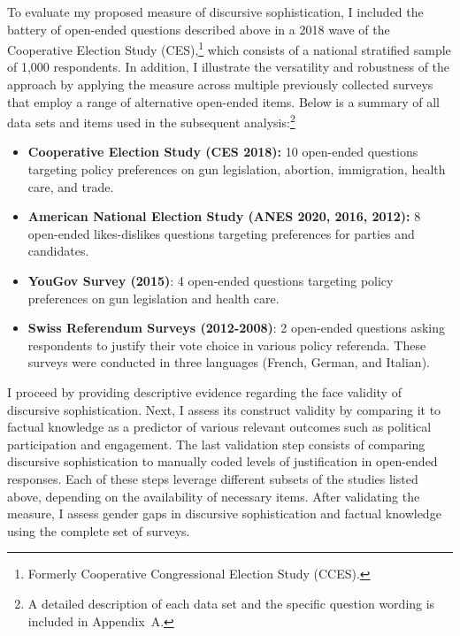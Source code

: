To evaluate my proposed measure of discursive sophistication, I included the battery of open-ended questions described above in a 2018 wave of the Cooperative Election Study (CES),\footnote{Formerly Cooperative Congressional Election Study (CCES).} which consists of a national stratified sample of 1,000 respondents. In addition, I illustrate the versatility and robustness of the approach by applying the measure across multiple previously collected surveys that employ a range of alternative open-ended items. Below is a summary of all data sets and items used in the subsequent analysis:\footnote{A detailed description of each data set and the specific question wording is included in Appendix~A.}

\begin{itemize}\singlespacing
	\item \textbf{Cooperative Election Study (CES 2018):} 10 open-ended questions targeting policy preferences on gun legislation, abortion, immigration, health care, and trade.
	\item \textbf{American National Election Study (ANES 2020, 2016, 2012):} 8 open-ended likes-dislikes questions targeting preferences for parties and candidates.
	\item \textbf{YouGov Survey (2015)}: 4 open-ended questions targeting policy preferences on gun legislation and health care.
	\item \textbf{Swiss Referendum Surveys (2012-2008)}: 2 open-ended questions asking respondents to justify their vote choice in various policy referenda. These surveys were conducted in three languages (French, German, and Italian).
\end{itemize}


I proceed by providing descriptive evidence regarding the face validity of discursive sophistication. Next, I assess its construct validity by comparing it to factual knowledge as a predictor of various relevant outcomes such as political participation and engagement. The last validation step consists of comparing discursive sophistication to manually coded levels of justification in open-ended responses. Each of these steps leverage different subsets of the studies listed above, depending on the availability of necessary items. After validating the measure, I assess gender gaps in discursive sophistication and factual knowledge using the complete set of surveys.


